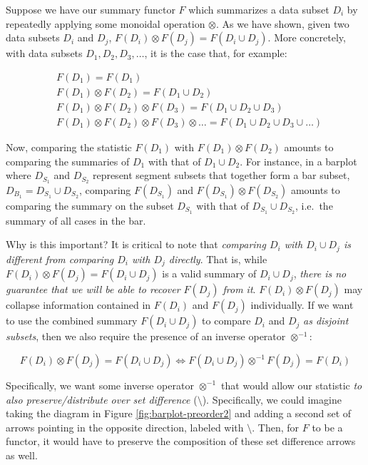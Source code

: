 \documentclass[
]{book}
\theoremstyle{definition}
\theoremstyle{definition}
\theoremstyle{definition}
\theoremstyle{definition}
\theoremstyle{remark}
\begin{document}
Suppose we have our summary functor \(F\) which summarizes a data subset \(D_i\) by repeatedly applying some monoidal operation \(\otimes\). As we have shown, given two data subsets \(D_i\) and \(D_j\), \(F(D_i) \otimes F(D_j) = F(D_i \cup D_j)\). More concretely, with data subsets \(D_1, D_2, D_3, \ldots\), it is the case that, for example:

\begin{align}

&F(D_1) = F(D_1) \\
&F(D_1) \otimes F(D_2) = F(D_1 \cup D_2) \\
&F(D_1) \otimes F(D_2) \otimes F(D_3) = F(D_1 \cup D_2 \cup D_3) \\
&F(D_1) \otimes F(D_2) \otimes F(D_3) \otimes \ldots = F(D_1 \cup D_2 \cup D_3 \cup \ldots)

\end{align}

Now, comparing the statistic \(F(D_1)\) with \(F(D_1) \otimes F(D_2)\) amounts to comparing the summaries of \(D_1\) with that of \(D_1 \cup D_2\). For instance, in a barplot where \(D_{S_1}\) and \(D_{S_2}\) represent segment subsets that together form a bar subset, \(D_{B_1} = D_{S_1} \cup D_{S_2}\), comparing \(F(D_{S_1})\) and \(F(D_{S_1}) \otimes F(D_{S_2})\) amounts to comparing the summary on the subset \(D_{S_1}\) with that of \(D_{S_1} \cup D_{S_2}\), i.e.~the summary of all cases in the bar.

Why is this important? It is critical to note that \emph{comparing \(D_i\) with \(D_i \cup D_j\) is different from comparing \(D_i\) with \(D_j\) directly}. That is, while \(F(D_i) \otimes F(D_j) = F(D_i \cup D_j)\) is a valid summary of \(D_i \cup D_j\), \emph{there is no guarantee that we will be able to recover \(F(D_j)\) from it}. \(F(D_i) \otimes F(D_j)\) may collapse information contained in \(F(D_i)\) and \(F(D_j)\) individually. If we want to use the combined summary \(F(D_i \cup D_j)\) to compare \(D_i\) and \(D_j\) \emph{as disjoint subsets}, then we also require the presence of an inverse operator \(\otimes^{-1}\):

\[F(D_i) \otimes F(D_j) = F(D_i \cup D_j) \iff F(D_i \cup D_j) \otimes^{-1} F(D_j) = F(D_i)\]

Specifically, we want some inverse operator \(\otimes^{-1}\) that would allow our statistic \emph{to also preserve/distribute over set difference} (\(\setminus\)). Specifically, we could imagine taking the diagram in Figure \ref{fig:barplot-preorder2} and adding a second set of arrows pointing in the opposite direction, labeled with \(\setminus\). Then, for \(F\) to be a functor, it would have to preserve the composition of these set difference arrows as well.
\end{document}
